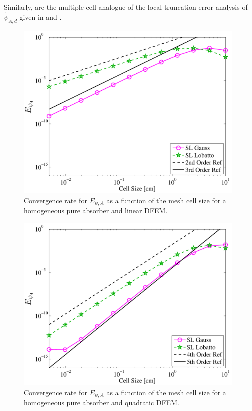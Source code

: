 Similarly,  are the multiple-cell analogue of the local truncation error analysis of $\widetilde{\psi}_{A,d}$ given in  and .  
\begin{figure}[!hbp]
\centering
\includegraphics[width=11cm]{chapter2_constant_xs/Linear_L2A_err-eps-converted-to.pdf}
\caption{Convergence rate for $E_{\psi,A}$ as a function of the mesh cell size for a homogeneous pure absorber and linear DFEM.}
\label{fig:multi_L2A_p1}
\end{figure}
\begin{figure}[!htp]
\centering
\includegraphics[width=11cm]{chapter2_constant_xs/Quadratic_L2A_err-eps-converted-to.pdf}
\caption{Convergence rate for $E_{\psi,A}$ as a function of the mesh cell size for a homogeneous pure absorber and quadratic DFEM.}
\label{fig:multi_L2A_p2}
\end{figure}

